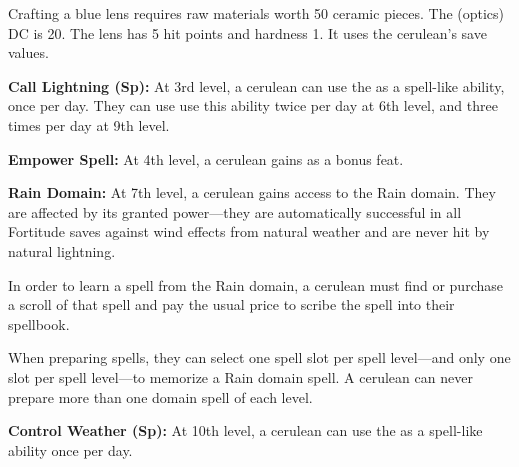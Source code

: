 {Crafting a blue lens requires raw materials worth 50 ceramic pieces. The  (optics) DC is 20. The lens has 5 hit points and hardness 1. It uses the cerulean's save values.

\textbf{Call Lightning (Sp):} At 3rd level, a cerulean can use the  as a spell-like ability, once per day. They can use use this ability twice per day at 6th level, and three times per day at 9th level.

\textbf{Empower Spell:} At 4th level, a cerulean gains  as a bonus feat.

\textbf{Rain Domain:} At 7th level, a cerulean gains access to the Rain domain. They are affected by its granted power---they are automatically successful in all Fortitude saves against wind effects from natural weather and are never hit by natural lightning.

In order to learn a spell from the Rain domain, a cerulean must find or purchase a scroll of that spell and pay the usual price to scribe the spell into their spellbook. 

When preparing spells, they can select one spell slot per spell level---and only one slot per spell level---to memorize a Rain domain spell. A cerulean can never prepare more than one domain spell of each level.

\textbf{Control Weather (Sp):} At 10th level, a cerulean can use the  as a spell-like ability once per day.
}
